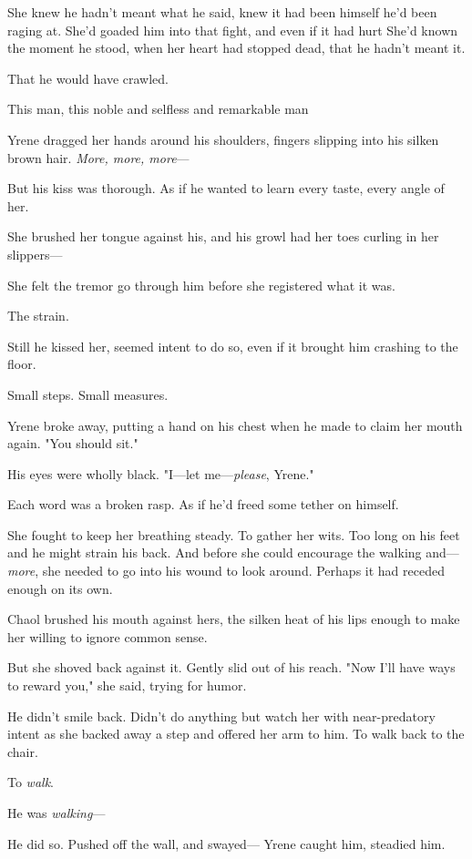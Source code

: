She knew he hadn't meant what he said, knew it had been himself he'd been raging at. She'd goaded him into that fight, and even if it had hurt  She'd known the moment he stood, when her heart had stopped dead, that he hadn't meant it.

That he would have crawled.

This man, this noble and selfless and remarkable man 

Yrene dragged her hands around his shoulders, fingers slipping into his silken brown hair. \emph{More, more, more}---

But his kiss was thorough. As if he wanted to learn every taste, every angle of her.

She brushed her tongue against his, and his growl had her toes curling in her slippers---

She felt the tremor go through him before she registered what it was.

The strain.

Still he kissed her, seemed intent to do so, even if it brought him crashing to the floor.

Small steps. Small measures.

Yrene broke away, putting a hand on his chest when he made to claim her mouth again. "You should sit."

His eyes were wholly black. "I---let me---\emph{please}, Yrene."

Each word was a broken rasp. As if he'd freed some tether on himself.

She fought to keep her breathing steady. To gather her wits. Too long on his feet and he might strain his back. And before she could encourage the walking and---\emph{more}, she needed to go into his wound to look around. Perhaps it had receded enough on its own.

Chaol brushed his mouth against hers, the silken heat of his lips enough to make her willing to ignore common sense.

But she shoved back against it. Gently slid out of his reach. "Now I'll have ways to reward you," she said, trying for humor.

He didn't smile back. Didn't do anything but watch her with near-predatory intent as she backed away a step and offered her arm to him. To walk back to the chair.

To \emph{walk}.

He was \emph{walking}---

He did so. Pushed off the wall, and swayed--- Yrene caught him, steadied him.

